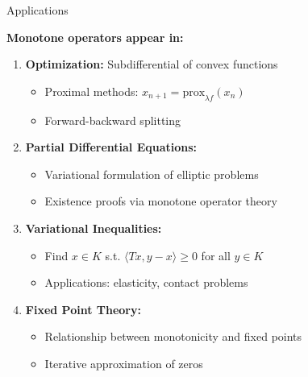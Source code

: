 \documentclass[aspectratio=169,10pt]{beamer}
\begin{document}
\begin{frame}{Applications}

\textbf{Monotone operators appear in:}

\begin{enumerate}
\item \textbf{Optimization:} Subdifferential of convex functions
  \begin{itemize}
  \item Proximal methods: $x_{n+1} = \text{prox}_{\lambda f}(x_n)$
  \item Forward-backward splitting
  \end{itemize}

\item \textbf{Partial Differential Equations:}
  \begin{itemize}
  \item Variational formulation of elliptic problems
  \item Existence proofs via monotone operator theory
  \end{itemize}

\item \textbf{Variational Inequalities:}
  \begin{itemize}
  \item Find $x \in K$ s.t. $\langle Tx, y - x \rangle \geq 0$ for all $y \in K$
  \item Applications: elasticity, contact problems
  \end{itemize}

\item \textbf{Fixed Point Theory:}
  \begin{itemize}
  \item Relationship between monotonicity and fixed points
  \item Iterative approximation of zeros
  \end{itemize}
\end{enumerate}

\end{frame}
\end{document}
